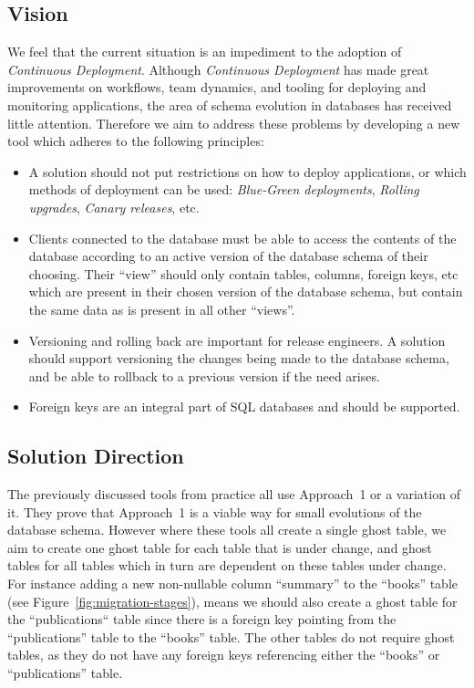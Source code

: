 \documentclass[conference]{IEEEtran}
\begin{document}
\subsection{Vision}

We feel that the current situation is an impediment to the adoption of \textit{Continuous Deployment}. Although \textit{Continuous Deployment} has made great improvements on workflows, team dynamics, and tooling for deploying and monitoring applications, the area of schema evolution in databases has received little attention. Therefore we aim to address these problems by developing a new tool which adheres to the following principles:

\begin{itemize}
  \item{A solution should not put restrictions on how to deploy applications, or which methods of deployment can be used: \textit{Blue-Green deployments}, \textit{Rolling upgrades}, \textit{Canary releases}, etc.}
  \item{Clients connected to the database must be able to access the contents of the database according to an active version of the database schema of their choosing. Their ``view'' should only contain tables, columns, foreign keys, etc which are present in their chosen version of the database schema, but contain the same data as is present in all other ``views''.}
  \item{Versioning and rolling back are important for release engineers. A solution should support versioning the changes being made to the database schema, and be able to rollback to a previous version if the need arises.}
  \item{Foreign keys are an integral part of SQL databases and should be supported.}
\end{itemize}

\subsection{Solution Direction}

The previously discussed tools from practice all use Approach~1 or a variation of it. They prove that Approach~1 is a viable way for small evolutions of the database schema. However where these tools all create a single ghost table, we aim to create one ghost table for each table that is under change, and ghost tables for all tables which in turn are dependent on these tables under change. For instance adding a new non-nullable column ``summary'' to the ``books'' table (see Figure~\ref{fig:migration-stages}), means we should also create a ghost table for the ``publications`` table since there is a foreign key pointing from the ``publications'' table to the ``books'' table. The other tables do not require ghost tables, as they do not have any foreign keys referencing either the ``books'' or ``publications'' table. 
\end{document}
